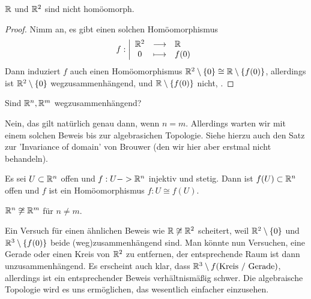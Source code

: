 \begin{corollary}\label{cor:R-und-R2-sind-nicht-homöomorph}
    $\mathbb{R}$ und $\mathbb{R}^2$ sind nicht homöomorph.
\end{corollary}
\begin{proof}
    Nimm an, es gibt einen solchen Homöomorphismus
        \begin{equation*}
        f: \left| \begin{array}{c c l} 
        \mathbb{R}^2 & \longrightarrow & \mathbb{R} \\
        0 & \longmapsto &  f(0)
        \end{array} \right.
    \end{equation*}
    Dann induziert $f$ auch einen Homöomorphismus $\mathbb{R}^2 \setminus \left \{0\right\} \cong \mathbb{R} \setminus \left \{f(0)\right\} $, allerdings ist $\mathbb{R}^2 \setminus \left \{0\right\} $ wegzusammenhängend, und $\mathbb{R} \setminus \left \{f(0)\right\} $ nicht, \contra.
\end{proof}

\begin{question}
    Sind $\mathbb{R}^n, \mathbb{R}^m$ wegzusammenhängend?
\end{question}

\begin{answer}
    Nein, das gilt natürlich genau dann, wenn $n = m$. Allerdings warten wir mit einem solchen Beweis bis zur algebrasichen Topologie. Siehe hierzu auch den Satz zur 'Invariance of domain' von Brouwer (den wir hier aber erstmal nicht behandeln).
    \begin{theorem**}
        Es sei $U\subset \mathbb{R}^n$ offen und $f: U -> \mathbb{R}^n$ injektiv und stetig. Dann ist $f(U)\subset \mathbb{R}^n$ offen und $f$ ist ein Homöomorphismus  $f: U \cong f(U)$.
    \end{theorem**}
    \begin{corollary**}
        $\mathbb{R}^n \not \cong \mathbb{R}^m$ für $n\neq m$.
    \end{corollary**}
\end{answer}

Ein Versuch für einen ähnlichen Beweis wie $\mathbb{R} \not \cong \mathbb{R}^2$ scheitert, weil $\mathbb{R}^2 \setminus \left \{0\right\}$ und $\mathbb{R}^3 \setminus \left \{f(0)\right\} $ beide (weg)zusammenhängend sind. Man könnte nun Versuchen, eine Gerade oder einen Kreis von $\mathbb{R}^2$ zu entfernen, der entsprechende Raum ist dann unzusammenhängend. Es erscheint auch klar, dass $\mathbb{R}^3 \setminus f(\text{Kreis / Gerade})$, allerdings ist ein entsprechender Beweis verhältnismäßig schwer. Die algebraische Topologie wird es uns ermöglichen, das wesentlich einfacher einzusehen.

